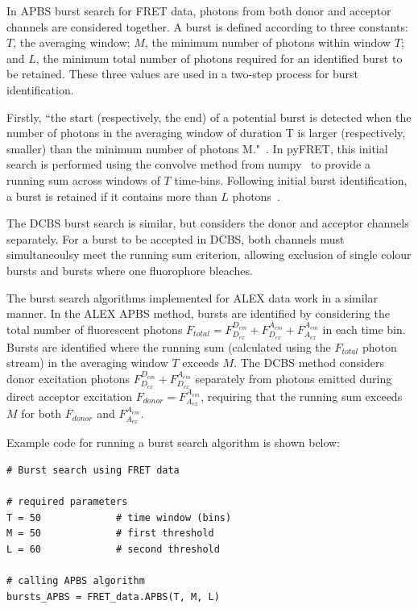In APBS burst search for FRET data, photons from both donor and acceptor channels are considered together. A burst is defined according to three constants: $T$, the averaging window; $M$, the minimum number of photons within window $T$; and $L$, the minimum total number of photons required for an identified burst to be retained. These three values are used in a two-step process for burst identification.

Firstly, ``the start (respectively, the end) of a potential burst is detected when the number of photons in the averaging window of duration T is larger (respectively, smaller) than the minimum number of photons M."~\cite{nir06}. In pyFRET, this initial search is performed using the convolve method from numpy~\cite{numpy11} to provide a running sum across windows of $T$ time-bins. Following initial burst identification, a burst is retained if it contains more than $L$ photons~\cite{nir06}.

The DCBS burst search is similar, but considers the donor and acceptor channels separately. For a burst to be accepted in DCBS, both channels must simultaneoulsy meet the running sum criterion, allowing exclusion of single colour bursts and bursts where one fluorophore bleaches.

The burst search algorithms implemented for ALEX data work in a similar manner. In the ALEX APBS method, bursts are identified by considering the total number of fluorescent photons $F_{total} = F_{D_{ex}}^{D_{em}} + F_{D_{ex}}^{A_{em}} + F_{A_{ex}}^{A_{em}}$ in each time bin. Bursts are identified where the running sum (calculated using the  $F_{total}$ photon stream) in the averaging window $T$ exceeds $M$. The DCBS method considers donor excitation photons $F_{D_{ex}}^{D_{em}} + F_{D_{ex}}^{A_{em}}$ separately from photons emitted during direct acceptor excitation $F_{donor} = F_{A_{ex}}^{A_{em}}$, requiring that the running sum exceeds $M$ for both $F_{donor}$ and $F_{A_{ex}}^{A_{em}}$.

Example code for running a burst search algorithm is shown below:

\begin{lstlisting}
# Burst search using FRET data

# required parameters
T = 50             # time window (bins)
M = 50             # first threshold
L = 60             # second threshold

# calling APBS algorithm
bursts_APBS = FRET_data.APBS(T, M, L)
\end{lstlisting}

